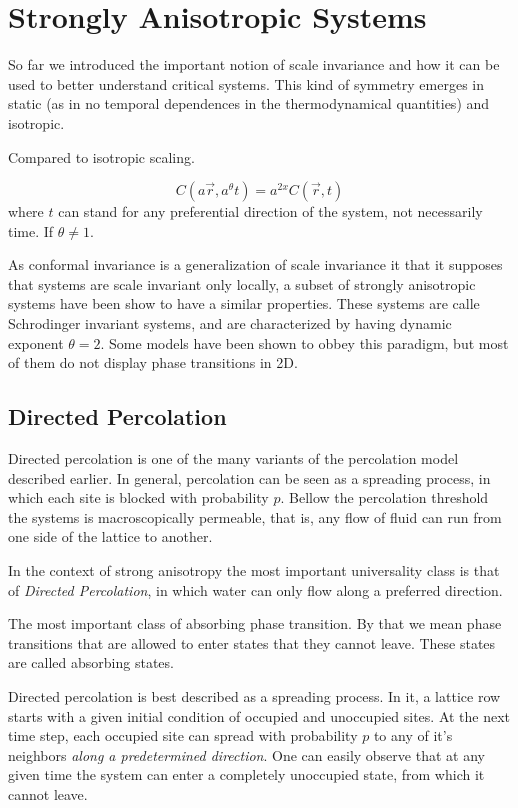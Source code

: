 \chapter{Strongly Anisotropic Systems}
\label{ch:anis}

So far we introduced the important notion of scale invariance and how it can be
used to better understand critical systems. This kind of symmetry emerges in
static (as in no temporal dependences in the thermodynamical quantities) and
isotropic.

Compared to isotropic scaling.

\begin{equation}
    C(a\vec{r}, a^\theta t) = a^{2x} C(\vec{r}, t)
\end{equation}
where $t$ can stand for any preferential direction of the
system, not necessarily time. If $\theta \neq 1$.

As conformal invariance is a generalization of scale invariance it that
it supposes that systems are scale invariant only locally, a subset
of strongly anisotropic systems have been show to have a similar properties.
These systems are calle Schrodinger invariant systems, and are characterized by
having dynamic exponent $\theta = 2$. Some models have been shown to obbey
this paradigm, but most of them do not display phase transitions in 2D.


\section{Directed Percolation}
\label{sec:dp}

Directed percolation is one of the many variants of the percolation model
described earlier. In general, percolation can be seen as a spreading process,
in which each site is blocked with probability $p$. Bellow the percolation
threshold the systems is macroscopically permeable, that is, any flow of
fluid can run from one side of the lattice to another. 

In the context of strong anisotropy the most important universality class is
that of \textit{Directed Percolation}, in which water can only flow along a
preferred direction.

The most important class of absorbing phase transition. By that we mean phase
transitions that are allowed to enter states that they cannot leave. These
states are called absorbing states. 

Directed percolation is best described as a spreading process. In it, a lattice
row starts with a given initial condition of occupied and unoccupied sites. At
the next time step, each occupied site can spread with probability $p$ to any
of it's neighbors \textit{along a predetermined direction}. One can easily
observe that at any given time the system can enter a completely unoccupied
state, from which it cannot leave.


